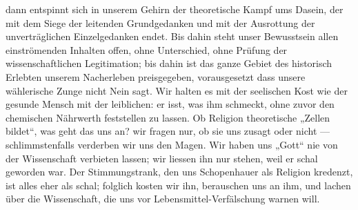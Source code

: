 dann entspinnt sich in unserem Gehirn der theoretische Kampf ums Dasein, der mit dem Siege der leitenden Grundgedanken und mit der Ausrottung der unverträglichen Einzelgedanken endet. Bis dahin steht unser Bewusstsein allen einströmenden Inhalten offen, ohne Unterschied, ohne Prüfung der wissenschaftlichen Legitimation; bis dahin ist das ganze Gebiet des historisch Erlebten unserem Nacherleben preisgegeben, vorausgesetzt dass unsere wählerische Zunge nicht Nein sagt. Wir halten es mit der seelischen Kost wie der gesunde Mensch mit der leiblichen: er isst, was ihm schmeckt, ohne zuvor den chemischen Nährwerth feststellen zu lassen. Ob Religion theoretische „Zellen bildet“, was geht das uns an? wir fragen nur, ob sie uns zusagt oder nicht — schlimmstenfalls verderben wir uns den Magen. Wir haben uns „Gott“ nie von der Wissenschaft verbieten lassen; wir liessen ihn nur stehen, weil er schal geworden war. Der Stimmungstrank, den uns Schopenhauer als Religion kredenzt, ist alles eher als schal; folglich kosten wir ihn, berauschen uns an ihm, und lachen über die Wissenschaft, die uns vor Lebensmittel-Verfälschung warnen will.
\par

